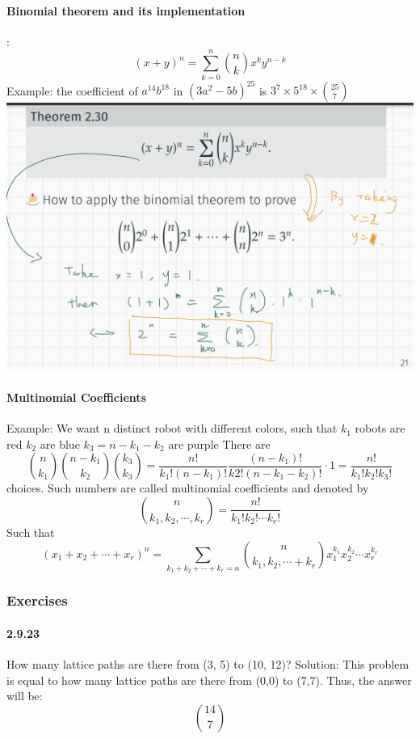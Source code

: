 \documentclass{article}
\begin{document}
\paragraph{Binomial theorem and its implementation}:\newline
$$(x+y)^{n}=\sum_{k=0}^{n}\binom{n}{k}x^ky^{n-k}$$
Example:\newline
the coefficient of $a^{14}b^{18}$ in $(3a^2-5b)^{25}$ is $3^{7}\times 5^{18}\times \binom{25}{7}$\newline
\includegraphics{0003}
\paragraph{Multinomial Coefficients}
Example:\newline
We want n distinct robot with different colors, such that \newline
$k_1$ robots are red\newline
$k_2$ are blue\newline
$k_3=n-k_1-k_2$ are purple\newline
There are 
$$\binom{n}{k_1} \binom{n-k_1}{k_2} \binom{k_3}{k_3}=\frac{n!}{k_1!(n-k_1)!} \frac{(n-k_1)!}{k2!(n-k_1-k_2)!}\cdot 1=\frac{n!}{k_1!k_2!k_3!}$$
choices. \newline
Such numbers are called multinomial coefficients and denoted by
$$\binom{n}{k_1,k_2,\cdots ,k_r}=\frac{n!}{k_1!k_2!\cdots k_r!}$$
Such that
$$(x_1+x_2+\cdots +x_r)^n=\sum_{k_1+k_2+\cdots +k_r=n}\binom{n}{k_1,k_2,\cdots +k_r}x^{k_1}_1 x^{k_2}_2 \cdots x^{k_r}_r$$
\subsubsection{Exercises}
\paragraph{2.9.23}
How many lattice paths are there from (3, 5) to (10, 12)? \newline
Solution:\newline
This problem is equal to how many lattice paths are there from (0,0) to (7,7). Thus, the answer will be:
$$\binom{14}{7}$$
\end{document}
